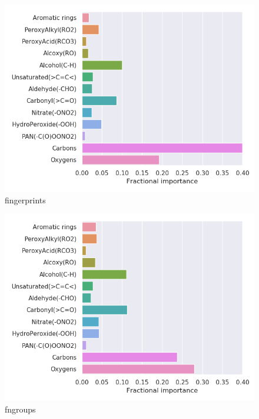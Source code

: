 \vspace{-.4cm}
\begin{subfigure}[b]{0.46\textwidth}
    \centering
    \includegraphics[width=\textwidth]{outputs/PCA/fingerprints/legend.png}
    \caption{fingerprints}
    \label{fig:legend_PCA_fingerprints}
\end{subfigure}
\begin{subfigure}[b]{0.46\textwidth}
    \centering
    \includegraphics[width=\textwidth]{outputs/PCA/fngroups/legend.png}
    \caption{fngroups}
    \label{fig:legend_PCA_fngroups}
\end{subfigure}\\
